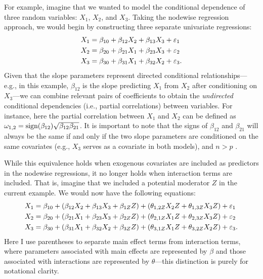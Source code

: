 For example, imagine that we wanted to model the conditional dependence of three random variables: $X_1$, $X_2$, and $X_3$. Taking the nodewise regression approach, we would begin by constructing three separate univariate regressions:
\begin{equation} \label{mod0}
    \begin{split}
        X_1 &= \beta_{10} + \beta_{12} X_2 + \beta_{13} X_3 + \varepsilon_1 \\
        X_2 &= \beta_{20} + \beta_{21} X_1 + \beta_{23} X_3 + \varepsilon_2 \\
        X_3 &= \beta_{30} + \beta_{31} X_1 + \beta_{32} X_2 + \varepsilon_3.
    \end{split}
\end{equation}
Given that the slope parameters represent directed conditional relationships---e.g., in this example, $\beta_{12}$ is the slope predicting $X_1$ from $X_2$ after conditioning on $X_3$---we can combine relevant pairs of coefficients to obtain the \textit{undirected} conditional dependencies (i.e., partial correlations) between variables. For instance, here the partial correlation between $X_1$ and $X_2$ can be defined as $\omega_{1,2} = \text{sign}({\beta_{12}})\sqrt{\beta_{12}\beta_{21}}$. It is important to note that the signs of $\beta_{12}$ and $\beta_{21}$ will always be the same if and only if the two slope parameters are conditioned on the same covariates (e.g., $X_3$ serves as a covariate in both models), and $n > p$ \cite{williams2019nonregularized}. 

While this equivalence holds when exogenous covariates are included as predictors in the nodewise regressions, it no longer holds when interaction terms are included. That is, imagine that we included a potential moderator $Z$ in the current example. We would now have the following equations:
\begin{equation} \label{mod1}
    \begin{split}
        X_1 &= \beta_{10} + (\beta_{12} X_2 + \beta_{13} X_3 + \beta_{1Z} Z) + (\theta_{1,2Z} X_2 Z + \theta_{1,3Z} X_3 Z) + \varepsilon_1 \\
        X_2 &= \beta_{20} + (\beta_{21} X_1 + \beta_{23} X_3 + \beta_{2Z} Z) + (\theta_{2,1Z} X_1 Z + \theta_{2,3Z} X_3 Z) + \varepsilon_2 \\
        X_3 &= \beta_{30} + (\beta_{31} X_1 + \beta_{32} X_2 + \beta_{3Z} Z) + (\theta_{3,1Z} X_1 Z + \theta_{3,2Z} X_2 Z) + \varepsilon_3.
    \end{split}
\end{equation}
Here I use parentheses to separate main effect terms from interaction terms, where parameters associated with main effects are represented by $\beta$ and those associated with interactions are represented by $\theta$---this distinction is purely for notational clarity.

